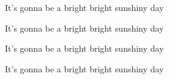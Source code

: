\begin{song}
\bigskip

It's gonna be a bright  bright  sunshiny day \par
It's gonna be a bright  bright  sunshiny day \par
It's gonna be a bright  bright  sunshiny day \par
It's gonna be a bright  bright  sunshiny day \par

\end{song}
